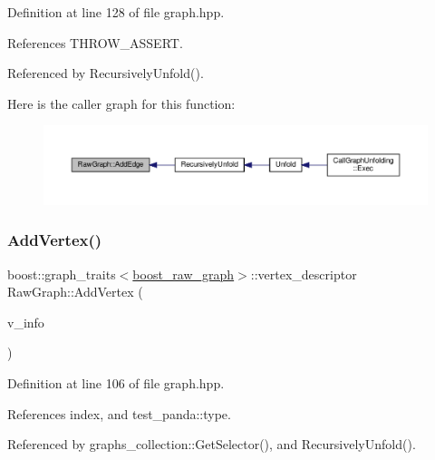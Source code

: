 Definition at line 128 of file graph.\+hpp.



References T\+H\+R\+O\+W\+\_\+\+A\+S\+S\+E\+RT.



Referenced by Recursively\+Unfold().

Here is the caller graph for this function\+:
\nopagebreak
\begin{figure}[H]
\begin{center}
\leavevmode
\includegraphics[width=350pt]{dc/dd2/structRawGraph_a5da66a6913553ac02de8405f98c0089a_icgraph}
\end{center}
\end{figure}
\mbox{\label{structRawGraph_ade8aabe1902c1e01ce11c0f62defd2e2}} 
\subsubsection{\texorpdfstring{Add\+Vertex()}{AddVertex()}}
{\footnotesize\ttfamily boost\+::graph\+\_\+traits$<$\hyperlink{graph_8hpp_afdae34b3d2ab29778d96da05f66add5c}{boost\+\_\+raw\+\_\+graph}$>$\+::vertex\+\_\+descriptor Raw\+Graph\+::\+Add\+Vertex (\begin{DoxyParamCaption}\item[{const \hyperlink{node__info_8hpp_a345f052eed4efe04f7848fd0ebd015b2}{Node\+Info\+Ref}}]{v\+\_\+info }\end{DoxyParamCaption})\hspace{0.3cm}{\ttfamily [inline]}}



Definition at line 106 of file graph.\+hpp.



References index, and test\+\_\+panda\+::type.



Referenced by graphs\+\_\+collection\+::\+Get\+Selector(), and Recursively\+Unfold().

